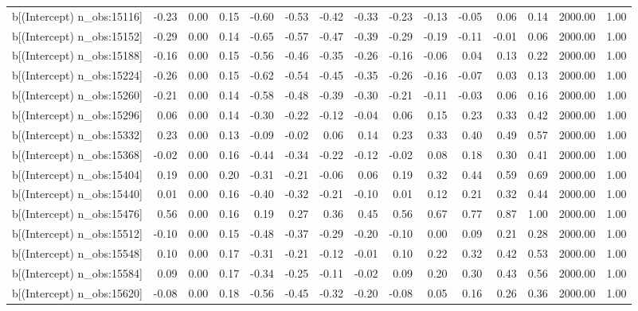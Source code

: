 \begin{table}[ht]
\begin{tabular}{rrrrrrrrrrrrrrr}
  b[(Intercept) n\_obs:15116] & -0.23 & 0.00 & 0.15 & -0.60 & -0.53 & -0.42 & -0.33 & -0.23 & -0.13 & -0.05 & 0.06 & 0.14 & 2000.00 & 1.00 \\ 
  b[(Intercept) n\_obs:15152] & -0.29 & 0.00 & 0.14 & -0.65 & -0.57 & -0.47 & -0.39 & -0.29 & -0.19 & -0.11 & -0.01 & 0.06 & 2000.00 & 1.00 \\ 
  b[(Intercept) n\_obs:15188] & -0.16 & 0.00 & 0.15 & -0.56 & -0.46 & -0.35 & -0.26 & -0.16 & -0.06 & 0.04 & 0.13 & 0.22 & 2000.00 & 1.00 \\ 
  b[(Intercept) n\_obs:15224] & -0.26 & 0.00 & 0.15 & -0.62 & -0.54 & -0.45 & -0.35 & -0.26 & -0.16 & -0.07 & 0.03 & 0.13 & 2000.00 & 1.00 \\ 
  b[(Intercept) n\_obs:15260] & -0.21 & 0.00 & 0.14 & -0.58 & -0.48 & -0.39 & -0.30 & -0.21 & -0.11 & -0.03 & 0.06 & 0.16 & 2000.00 & 1.00 \\ 
  b[(Intercept) n\_obs:15296] & 0.06 & 0.00 & 0.14 & -0.30 & -0.22 & -0.12 & -0.04 & 0.06 & 0.15 & 0.23 & 0.33 & 0.42 & 2000.00 & 1.00 \\ 
  b[(Intercept) n\_obs:15332] & 0.23 & 0.00 & 0.13 & -0.09 & -0.02 & 0.06 & 0.14 & 0.23 & 0.33 & 0.40 & 0.49 & 0.57 & 2000.00 & 1.00 \\ 
  b[(Intercept) n\_obs:15368] & -0.02 & 0.00 & 0.16 & -0.44 & -0.34 & -0.22 & -0.12 & -0.02 & 0.08 & 0.18 & 0.30 & 0.41 & 2000.00 & 1.00 \\ 
  b[(Intercept) n\_obs:15404] & 0.19 & 0.00 & 0.20 & -0.31 & -0.21 & -0.06 & 0.06 & 0.19 & 0.32 & 0.44 & 0.59 & 0.69 & 2000.00 & 1.00 \\ 
  b[(Intercept) n\_obs:15440] & 0.01 & 0.00 & 0.16 & -0.40 & -0.32 & -0.21 & -0.10 & 0.01 & 0.12 & 0.21 & 0.32 & 0.44 & 2000.00 & 1.00 \\ 
  b[(Intercept) n\_obs:15476] & 0.56 & 0.00 & 0.16 & 0.19 & 0.27 & 0.36 & 0.45 & 0.56 & 0.67 & 0.77 & 0.87 & 1.00 & 2000.00 & 1.00 \\ 
  b[(Intercept) n\_obs:15512] & -0.10 & 0.00 & 0.15 & -0.48 & -0.37 & -0.29 & -0.20 & -0.10 & 0.00 & 0.09 & 0.21 & 0.28 & 2000.00 & 1.00 \\ 
  b[(Intercept) n\_obs:15548] & 0.10 & 0.00 & 0.17 & -0.31 & -0.21 & -0.12 & -0.01 & 0.10 & 0.22 & 0.32 & 0.42 & 0.53 & 2000.00 & 1.00 \\ 
  b[(Intercept) n\_obs:15584] & 0.09 & 0.00 & 0.17 & -0.34 & -0.25 & -0.11 & -0.02 & 0.09 & 0.20 & 0.30 & 0.43 & 0.56 & 2000.00 & 1.00 \\ 
  b[(Intercept) n\_obs:15620] & -0.08 & 0.00 & 0.18 & -0.56 & -0.45 & -0.32 & -0.20 & -0.08 & 0.05 & 0.16 & 0.26 & 0.36 & 2000.00 & 1.00 \\ 

\end{tabular}
\end{table}
